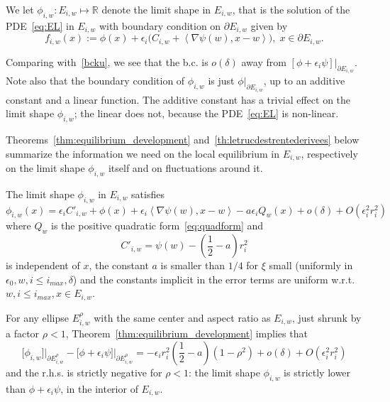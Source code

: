 \documentclass[AHL,Unicode,longabstracts,published]{cedram}
\newcommand{\R}{\mathbb{R}}
\begin{document}
\begin{defi}\label{def:phiiw}
We let $\phi_{i,w}:E_{i,w}\mapsto \R$ denote the limit shape in $E_{i,w}$, that is the solution of the PDE~\eqref{eq:EL} in $E_{i,w}$ with boundary condition on $\partial E_{i,w}$ given by
\begin{equation}\label{eq:bcku1}
f_{i,w}(x):= \phi(x)+\epsilon_i\Big(C_{i,w}+ \left\langle \nabla\psi(w), x-w\right\rangle\Big),\;x\in \partial E_{i,w}.
\end{equation}
\end{defi}

Comparing with~\eqref{bcku}, we see that the b.c. is $o(\delta)$ away from $[\phi+\epsilon_i\psi]|_{\partial E_{i,w}}$. Note also that the boundary condition of $\phi_{i,w}$ is just $\phi|_{\partial E_{i,w}}$, up to an additive constant and a linear function. The additive constant has a trivial effect on the limit shape $\phi_{i,w}$; the linear does not, because the PDE~\eqref{eq:EL} is non-linear.

Theorems~\ref{thm:equilibrium_development} and~\ref{th:letrucdestrentederivees} below summarize the information we need on the local equilibrium in $E_{i,w}$, respectively on the limit shape $\phi_{i,w}$ itself and on fluctuations around it.



\begin{theo}\label{thm:equilibrium_development}
The limit shape $\phi_{i,w}$ in $E_{i,w}$ satisfies
\begin{equation}\label{eq:sa3}
\phi_{i,w}(x)=\epsilon_i C'_{i,w}+\phi(x)+\epsilon_i \left\langle \nabla\psi(w), x-w\right\rangle-a\epsilon_i Q_w(x) +o(\delta)+O\left(\epsilon_i^2 r_i^2\right)
\end{equation}
where $Q_w$ is the positive quadratic form~\eqref{eq:quadform} and
\begin{equation}\label{eq:C''}
C'_{i,w}=\psi(w)-\left(\frac12-a\right) r_i^2
\end{equation}
is independent of $x$, the constant $a$ is smaller than $1/4$ for $\xi$ small (uniformly in $\epsilon_0,w,i\le i_{max},\delta$) and the constants implicit in the error terms are uniform w.r.t. $w,i\le i_{max}, x\in E_{i,w}$.
\end{theo}

\begin{rema}
For any ellipse $E^\rho_{i,w}$ with the same center and aspect ratio as $E_{i,w}$, just shrunk by a factor $\rho<1$, Theorem~\ref{thm:equilibrium_development} implies that
\begin{equation}\label{eq:psinonpsi}
\big[\phi_{i,w}\big]\big|_{\partial E^\rho_{i,w}}- \big[\phi+\epsilon_i \psi\big]\big|_{\partial E^\rho_{i,w}}=-\epsilon_i r_i^2
\left(\frac12-a\right)\left(1-\rho^2\right)+o(\delta)+O\left(\epsilon_i^2r_i^2\right)
\end{equation}
and the r.h.s. is strictly negative for $\rho<1$: the limit shape $\phi_{i,w}$ is strictly lower than $\phi+\epsilon_i\psi$, in the interior of $E_{i,w}$.
\end{rema}
\end{document}
